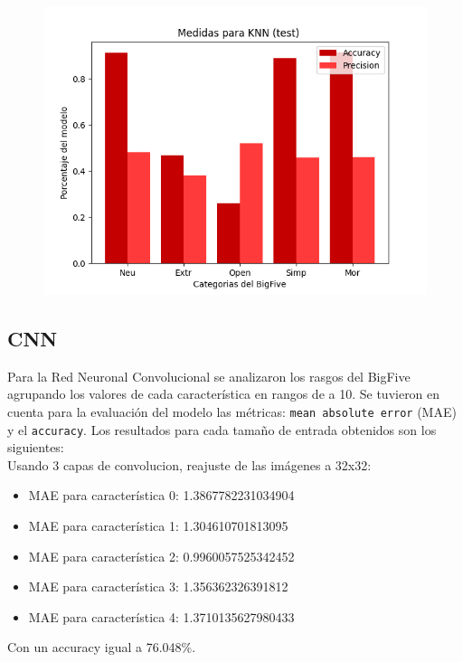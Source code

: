 \documentclass[10pt, a4paper]{article}
\begin{document}
                \begin{figure}[h!]
                    \centering
                    \includegraphics[width = 0.7\linewidth]{bar2_knn.png}
                \end{figure}

            \subsection{CNN} 
                Para la Red Neuronal Convolucional se analizaron los rasgos del BigFive agrupando los valores de cada caracter\'istica en rangos de a 10. 
                Se tuvieron en cuenta para la evaluaci\'on del modelo las m\'etricas: \texttt{mean absolute error} (MAE) y el \texttt{accuracy}.
                Los resultados para cada tama\~no de entrada obtenidos son los siguientes: \\

                Usando 3 capas de convolucion, reajuste de las im\'agenes a 32x32:\\
                \begin{itemize}
                    \item[] MAE para caracter\'istica 0: 1.3867782231034904 
                    \item[] MAE para caracter\'istica 1: 1.304610701813095 
                    \item[] MAE para caracter\'istica 2: 0.9960057525342452
                    \item[] MAE para caracter\'istica 3: 1.356362326391812
                    \item[] MAE para caracter\'istica 4: 1.3710135627980433
                \end{itemize}
                
                Con un accuracy igual a 76.048\%.\\
\end{document}
